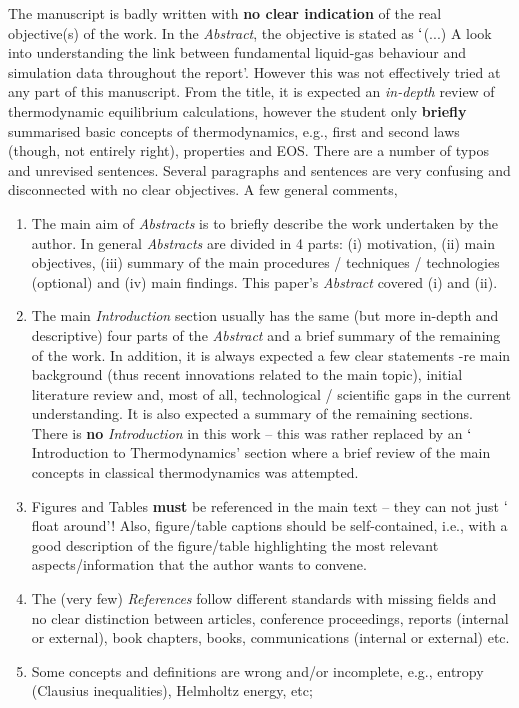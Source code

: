 \documentclass[14pt,twoside]{report}
\begin{document}
The manuscript is badly written with {\bf no clear indication} of the real objective(s) of the work. In the {\it Abstract}, the objective is stated as $\lq$(...) A look into understanding the link between fundamental liquid-gas behaviour and simulation data throughout the report'.  However this was not effectively tried at any part of this manuscript. From the title, it is expected an {\it in-depth} review of thermodynamic equilibrium calculations, however the student only {\bf briefly} summarised basic concepts of thermodynamics, e.g., first and second laws (though, not entirely right), properties and EOS. There are a number of typos and unrevised sentences. Several paragraphs and sentences are very confusing and disconnected with no clear objectives. A few general comments,
\begin{enumerate}
\item The main aim of {\it Abstracts} is to briefly describe the work undertaken by the author. In general {\it Abstracts} are divided in 4 parts: (i) motivation, (ii) main objectives, (iii) summary of the main procedures / techniques / technologies (optional) and (iv) main findings. This paper's {\it Abstract} covered (i) and (ii).
%
\item The main {\it Introduction} section usually has the same (but more in-depth and descriptive) four parts of the {\it Abstract} and a brief summary of the remaining of the work. In addition, it is always expected a few clear statements -re main background (thus recent innovations related to the main topic), initial literature review and, most of all, technological / scientific gaps in the current understanding. It is also expected a summary of the remaining sections. There is {\bf no} {\it Introduction} in this work -- this was rather replaced by an $\lq$Introduction to Thermodynamics' section where a brief review of the main concepts in classical thermodynamics was attempted. 
%
\item Figures and Tables {\bf must} be referenced in the main text -- they can not just $\lq$float around'! Also, figure/table captions should be self-contained, i.e., with a good description of the figure/table highlighting the most relevant aspects/information that the author wants to convene. 
%
\item The (very few) {\it References} follow different standards with missing fields and no clear distinction between articles, conference proceedings, reports (internal or external), book chapters, books, communications (internal or external) etc.  
%
\item Some concepts and definitions are wrong and/or incomplete, e.g., entropy (Clausius inequalities), Helmholtz energy, etc;

\end{enumerate}
\end{document}

